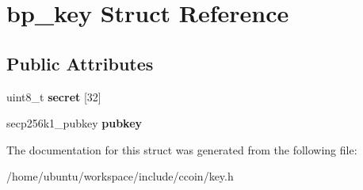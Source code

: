 \hypertarget{structbp__key}{\section{bp\-\_\-key Struct Reference}
\label{structbp__key}
}
\subsection*{Public Attributes}
\begin{DoxyCompactItemize}
\item 
\hypertarget{structbp__key_ab4e6c1d38f17f14bb04752df3d80f417}{uint8\-\_\-t {\bfseries secret} \mbox{[}32\mbox{]}}\label{structbp__key_ab4e6c1d38f17f14bb04752df3d80f417}

\item 
\hypertarget{structbp__key_a5762dd57c94c98d3ca3fecaccbb3f305}{secp256k1\-\_\-pubkey {\bfseries pubkey}}\label{structbp__key_a5762dd57c94c98d3ca3fecaccbb3f305}

\end{DoxyCompactItemize}


The documentation for this struct was generated from the following file\-:\begin{DoxyCompactItemize}
\item 
/home/ubuntu/workspace/include/ccoin/key.\-h\end{DoxyCompactItemize}
